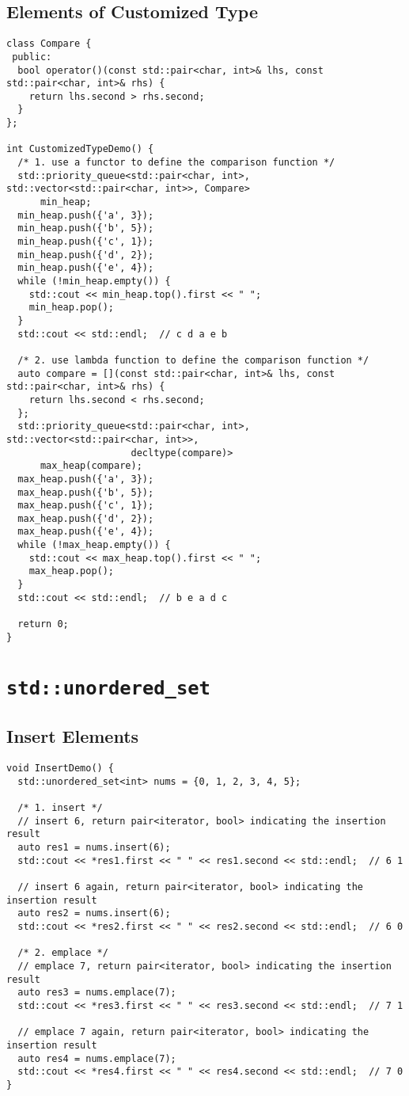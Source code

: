 \subsection{Elements of Customized Type}
\begin{lstlisting}
class Compare {
 public:
  bool operator()(const std::pair<char, int>& lhs, const std::pair<char, int>& rhs) {
    return lhs.second > rhs.second;
  }
};

int CustomizedTypeDemo() {
  /* 1. use a functor to define the comparison function */
  std::priority_queue<std::pair<char, int>, std::vector<std::pair<char, int>>, Compare>
      min_heap;
  min_heap.push({'a', 3});
  min_heap.push({'b', 5});
  min_heap.push({'c', 1});
  min_heap.push({'d', 2});
  min_heap.push({'e', 4});
  while (!min_heap.empty()) {
    std::cout << min_heap.top().first << " ";
    min_heap.pop();
  }
  std::cout << std::endl;  // c d a e b

  /* 2. use lambda function to define the comparison function */
  auto compare = [](const std::pair<char, int>& lhs, const std::pair<char, int>& rhs) {
    return lhs.second < rhs.second;
  };
  std::priority_queue<std::pair<char, int>, std::vector<std::pair<char, int>>,
                      decltype(compare)>
      max_heap(compare);
  max_heap.push({'a', 3});
  max_heap.push({'b', 5});
  max_heap.push({'c', 1});
  max_heap.push({'d', 2});
  max_heap.push({'e', 4});
  while (!max_heap.empty()) {
    std::cout << max_heap.top().first << " ";
    max_heap.pop();
  }
  std::cout << std::endl;  // b e a d c

  return 0;
}
\end{lstlisting}

\section{{\colorbox{CodeBackground}{\lstinline|std::unordered_set|}}}
\subsection{Insert Elements}
\begin{lstlisting}
void InsertDemo() {
  std::unordered_set<int> nums = {0, 1, 2, 3, 4, 5};

  /* 1. insert */
  // insert 6, return pair<iterator, bool> indicating the insertion result
  auto res1 = nums.insert(6);
  std::cout << *res1.first << " " << res1.second << std::endl;  // 6 1

  // insert 6 again, return pair<iterator, bool> indicating the insertion result
  auto res2 = nums.insert(6);
  std::cout << *res2.first << " " << res2.second << std::endl;  // 6 0

  /* 2. emplace */
  // emplace 7, return pair<iterator, bool> indicating the insertion result
  auto res3 = nums.emplace(7);
  std::cout << *res3.first << " " << res3.second << std::endl;  // 7 1

  // emplace 7 again, return pair<iterator, bool> indicating the insertion result
  auto res4 = nums.emplace(7);
  std::cout << *res4.first << " " << res4.second << std::endl;  // 7 0
}

\end{lstlisting}

